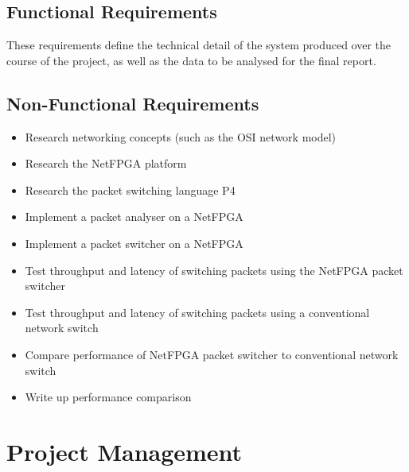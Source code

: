 \documentclass[12pt, a4paper, twoside, onecolumn]{IEEEtran}
\begin{document}
\subsection{Functional Requirements}
\label{functional_requirements}

These requirements define the technical detail of the system produced over the course of the project, as well as the data to be analysed for the final report.
\begin{enumerate}[label=\textbf{F\arabic*:}]
\end{enumerate}

\subsection{Non-Functional Requirements}
\label{non_functional_requirements}
\begin{enumerate}[label=\textbf{NF\arabic*:}]
\end{enumerate}
\begin{itemize}
  \item Research networking concepts (such as the OSI network model)
  \item Research the NetFPGA platform \cite{NetFPGA}
  \item Research the packet switching language P4 \cite{P4}
  \item Implement a packet analyser on a NetFPGA
  \item Implement a packet switcher on a NetFPGA
  \item Test throughput and latency of switching packets using the NetFPGA packet switcher
  \item Test throughput and latency of switching packets using a conventional network switch
  \item Compare performance of NetFPGA packet switcher to conventional network switch
  \item Write up performance comparison
\end{itemize}

\section{Project Management}
\label{project_management}
\end{document}

